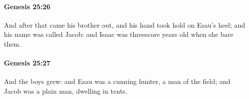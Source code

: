 		\paragraph{Genesis 25:26} %
			\label{GENESIS-25-26}

			And after that came his brother out, and his hand took hold on Esau's heel; and his name was called Jacob: and Isaac was threescore years old when she bare them.


		\paragraph{Genesis 25:27} %
			\label{GENESIS-25-27}

			And the boys grew: and Esau was a cunning hunter, a man of the field; and Jacob was a plain man, dwelling in tents.


